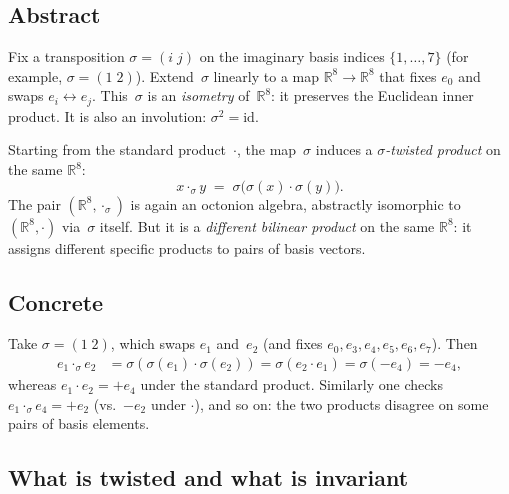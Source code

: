 \documentclass[11pt]{amsart}
\newcommand{\RR}{\mathbb{R}}
\begin{document}
\subsection*{Abstract}

Fix a transposition $\sigma = (i\; j)$ on the imaginary basis
indices $\{1, \ldots, 7\}$ (for example, $\sigma = (1\;2)$).
Extend~$\sigma$ linearly to a map $\RR^8 \to \RR^8$ that fixes
$e_0$ and swaps $e_i \leftrightarrow e_j$.  This~$\sigma$ is an
\emph{isometry} of~$\RR^8$: it preserves the Euclidean inner
product.  It is also an involution: $\sigma^2 = \mathrm{id}$.

Starting from the standard product~$\cdot$, the map~$\sigma$ induces
a \emph{$\sigma$-twisted product} on the same $\RR^8$:
\begin{equation}\label{eq:twist}
  x \cdot_\sigma y \;=\; \sigma\bigl(\sigma(x) \cdot \sigma(y)\bigr).
\end{equation}
The pair $(\RR^8, \cdot_\sigma)$ is again an octonion algebra,
abstractly isomorphic to $(\RR^8, \cdot)$ via~$\sigma$ itself.  But
it is a \emph{different bilinear product} on the same $\RR^8$: it
assigns different specific products to pairs of basis vectors.

\subsection*{Concrete}

Take $\sigma = (1\; 2)$, which swaps $e_1$ and~$e_2$ (and fixes
$e_0, e_3, e_4, e_5, e_6, e_7$).  Then
\begin{align*}
  e_1 \cdot_\sigma e_2
    &= \sigma(\sigma(e_1) \cdot \sigma(e_2))
     = \sigma(e_2 \cdot e_1)
     = \sigma(-e_4)
     = -e_4,
\end{align*}
whereas $e_1 \cdot e_2 = +e_4$ under the standard product.  Similarly
one checks $e_1 \cdot_\sigma e_4 = +e_2$ (vs.\ $-e_2$ under
$\cdot$), and so on: the two products disagree on some pairs of
basis elements.

\subsection*{What is twisted and what is invariant}
\end{document}

